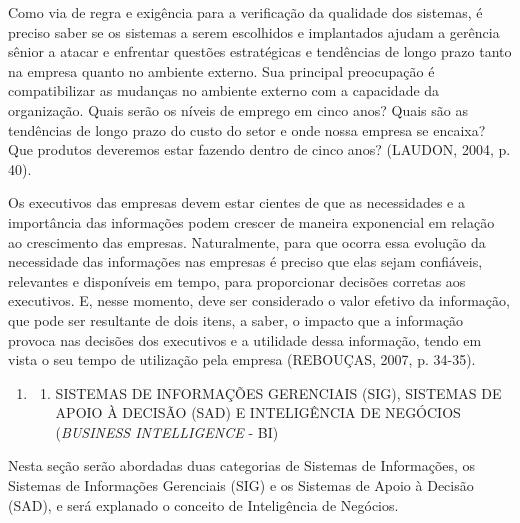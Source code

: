 \documentclass[a4paper]{article}
\newcounter{saveenum}
\newcommand\liststyleWWviiiNumi{%
\renewcommand\theenumi{\arabic{enumi}}
\renewcommand\theenumii{\arabic{enumi}.\arabic{enumii}}
\renewcommand\theenumiii{\arabic{enumi}.\arabic{enumii}.\arabic{enumiii}}
\renewcommand\theenumiv{\arabic{enumi}.\arabic{enumii}.\arabic{enumiii}.\arabic{enumiv}}
\renewcommand\labelenumi{\theenumi}
\renewcommand\labelenumii{\theenumii}
\renewcommand\labelenumiii{\theenumiii}
\renewcommand\labelenumiv{\theenumiv.}
}
\begin{document}
{\sffamily
Como via de regra e exig\^encia para a verifica\c{c}\~ao da qualidade dos sistemas, \'e preciso saber se os sistemas a
serem escolhidos e implantados ajudam a ger\^encia s\^enior a atacar e enfrentar quest\~oes estrat\'egicas e
tend\^encias de longo prazo tanto na empresa quanto no ambiente externo. Sua principal preocupa\c{c}\~ao \'e
compatibilizar as mudan\c{c}as no ambiente externo com a capacidade da organiza\c{c}\~ao. Quais ser\~ao os n\'iveis de
emprego em cinco anos? Quais s\~ao as tend\^encias de longo prazo do custo do setor e onde nossa empresa se encaixa?
Que produtos deveremos estar fazendo dentro de cinco anos? (LAUDON, 2004, p. 40). }

{\sffamily
Os executivos das empresas devem estar cientes de que as necessidades e a import\^ancia das informa\c{c}\~oes podem
crescer de maneira exponencial em rela\c{c}\~ao ao crescimento das empresas. Naturalmente, para que ocorra essa
evolu\c{c}\~ao da necessidade das informa\c{c}\~oes nas empresas \'e preciso que elas sejam confi\'aveis, relevantes e
dispon\'iveis em tempo, para proporcionar decis\~oes corretas aos executivos. E, nesse momento, deve ser considerado o
valor efetivo da informa\c{c}\~ao, que pode ser resultante de dois itens, a saber, o impacto que a informa\c{c}\~ao
provoca nas decis\~oes dos executivos e a utilidade dessa informa\c{c}\~ao, tendo em vista o seu tempo de
utiliza\c{c}\~ao pela empresa (REBOU\c{C}AS, 2007, p. 34-35).}


\bigskip

\liststyleWWviiiNumi
\setcounter{saveenum}{\value{enumi}}
\begin{enumerate}
\setcounter{enumi}{\value{saveenum}}
\item \setcounter{saveenum}{\value{enumii}}
\begin{enumerate}
\setcounter{enumii}{\value{saveenum}}
\item {
\textsf{SISTEMAS DE INFORMA\c{C}\~OES GERENCIAIS (SIG), SISTEMAS DE APOIO \`A DECIS\~AO (SAD) E INTELIG\^ENCIA DE
NEG\'OCIOS (}\textsf{\textit{BUSINESS INTELLIGENCE}}\textsf{ - BI)}}
\end{enumerate}
\end{enumerate}
{
\textsf{Nesta se\c{c}\~ao ser\~ao abordadas duas categorias de Sistemas de Informa\c{c}\~oes, os Sistemas de
Informa\c{c}\~oes Gerenciais (SIG) e os Sistemas de Apoio \`a Decis\~ao (SAD), e ser\'a explanado o conceito de
Intelig\^encia de Neg\'ocios.}}
\end{document}
